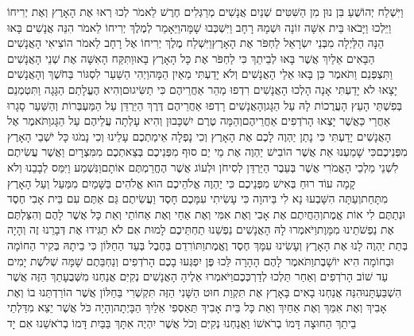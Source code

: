 \documentclass[../main/main.tex]{subfiles}
\begin{document}
\begin{multicols*}{\ncols}
וַיִּשְׁלַח יְהוֹשֻׁעַ בִּן נוּן מִן הַשִּׁטִּים שְׁנַיִם אֲנָשִׁים מְרַגְּלִים חֶרֶשׁ לֵאמֹר לְכוּ רְאוּ אֶת הָאָרֶץ וְאֶת יְרִיחוֹ וַיֵּלְכוּ וַיָּבֹאוּ בֵּית אִשָּׁה זוֹנָה וּשְׁמָהּ רָחָב וַיִּשְׁכְּבוּ שָׁמָּה\PreVerseSpace{}וַיֵּאָמַר לְמֶלֶךְ יְרִיחוֹ לֵאמֹר הִנֵּה אֲנָשִׁים בָּאוּ הֵנָּה הַלַּיְלָה מִבְּנֵי יִשְׂרָאֵל לַחְפֹּר אֶת הָאָרֶץ\PreVerseSpace{}וַיִּשְׁלַח מֶלֶךְ יְרִיחוֹ אֶל רָחָב לֵאמֹר הוֹצִיאִי הָאֲנָשִׁים הַבָּאִים אֵלַיִךְ אֲשֶׁר בָּאוּ לְבֵיתֵךְ כִּי לַחְפֹּר אֶת כָּל הָאָרֶץ בָּאוּ\PreVerseSpace{}וַתִּקַּח הָאִשָּׁה אֶת שְׁנֵי הָאֲנָשִׁים וַתִּצְפְּנֵם\SubEnd{} וַתֹּאמֶר כֵּן בָּאוּ אֵלַי הָאֲנָשִׁים וְלֹא יָדַעְתִּי מֵאַיִן הֵמָּה\PreVerseSpace{}וַיְהִי הַשַּׁעַר לִסְגּוֹר בַּחֹשֶׁךְ וְהָאֲנָשִׁים יָצָאוּ לֹא יָדַעְתִּי אָנָה הָלְכוּ הָאֲנָשִׁים רִדְפוּ מַהֵר אַחֲרֵיהֶם כִּי תַשִּׂיגוּם\PreVerseSpace{}וְהִיא הֶעֱלָתַם הַגָּגָה וַתִּטְמְנֵם בְּפִשְׁתֵּי הָעֵץ הָעֲרֻכוֹת לָהּ עַל הַגָּג\PreVerseSpace{}וְהָאֲנָשִׁים רָדְפוּ אַחֲרֵיהֶם דֶּרֶךְ הַיַּרְדֵּן עַל הַמַּעְבְּרוֹת וְהַשַּׁעַר סָגָרוּ אַחֲרֵי כַּאֲשֶׁר יָצְאוּ הָרֹדְפִים אַחֲרֵיהֶם\PreVerseSpace{}וְהֵמָּה טֶרֶם יִשְׁכָּבוּן וְהִיא עָלְתָה עֲלֵיהֶם עַל הַגָּג\PreVerseSpace{}וַתֹּאמֶר אֶל הָאֲנָשִׁים יָדַעְתִּי כִּי נָתַן יַהְוֶה לָכֶם אֶת הָאָרֶץ וְכִי נָפְלָה אֵימַתְכֶם עָלֵינוּ וְכִי נָמֹגוּ כָּל יֹשְׁבֵי הָאָרֶץ מִפְּנֵיכֶם\PreVerseSpace{}כִּי שָׁמַעְנוּ אֵת אֲשֶׁר הוֹבִישׁ יַהְוֶה אֶת מֵי יַם סוּף מִפְּנֵיכֶם בְּצֵאתְכֶם מִמִּצְרָיִם וַאֲשֶׁר עֲשִׂיתֶם לִשְׁנֵי מַלְכֵי הָאֱמֹרִי אֲשֶׁר בְּעֵבֶר הַיַּרְדֵּן לְסִיחֹן וּלְעוֹג אֲשֶׁר הֶחֱרַמְתֶּם אוֹתָם\PreVerseSpace{}וַנִּשְׁמַע וַיִּמַּס לְבָבֵנוּ וְלֹא קָמָה עוֹד רוּחַ בְּאִישׁ מִפְּנֵיכֶם כִּי יַהְוֶה אֱלֹהֵיכֶם הוּא אֱלֹהִים בַּשָּׁמַיִם מִמַּעַל וְעַל הָאָרֶץ מִתָּחַת\PreVerseSpace{}וְעַתָּה הִשָּׁבְעוּ נָא לִי בַּיהוָה כִּי עָשִׂיתִי עִמָּכֶם חָסֶד וַעֲשִׂיתֶם גַּם אַתֶּם עִם בֵּית אָבִי חֶסֶד וּנְתַתֶּם לִי אוֹת אֱמֶת\PreVerseSpace{}וְהַחֲיִתֶם אֶת אָבִי וְאֶת אִמִּי וְאֶת אַחַי וְאֶת אַחוֹתַי וְאֵת כָּל אֲשֶׁר לָהֶם וְהִצַּלְתֶּם אֶת נַפְשֹׁתֵינוּ מִמָּוֶת\PreVerseSpace{}וַיֹּאמְרוּ לָהּ הָאֲנָשִׁים נַפְשֵׁנוּ תַחְתֵּיכֶם לָמוּת אִם לֹא תַגִּידוּ אֶת דְּבָרֵנוּ זֶה וְהָיָה בְּתֵת יַהְוֶה לָנוּ אֶת הָאָרֶץ וְעָשִׂינוּ עִמָּךְ חֶסֶד וֶאֱמֶת\PreVerseSpace{}וַתּוֹרִדֵם בַּחֶבֶל בְּעַד הַחַלּוֹן כִּי בֵיתָהּ בְּקִיר הַחוֹמָה וּבַחוֹמָה הִיא יוֹשָׁבֶת\PreVerseSpace{}וַתֹּאמֶר לָהֶם הָהָרָה לֵּכוּ פֶּן יִפְגְּעוּ בָכֶם הָרֹדְפִים וְנַחְבֵּתֶם שָׁמָּה שְׁלֹשֶׁת יָמִים עַד שׁוֹב הָרֹדְפִים וְאַחַר תֵּלְכוּ לְדַרְכְּכֶם\PreVerseSpace{}וַיֹּאמְרוּ אֵלֶיהָ הָאֲנָשִׁים נְקִיִּם אֲנַחְנוּ מִשְּׁבֻעָתֵךְ הַזֶּה אֲשֶׁר הִשְׁבַּעְתָּנוּ\PreVerseSpace{}הִנֵּה אֲנַחְנוּ בָאִים בָּאָרֶץ אֶת תִּקְוַת חוּט הַשָּׁנִי הַזֶּה תִּקְשְׁרִי בַּחַלּוֹן אֲשֶׁר הוֹרַדְתֵּנוּ בוֹ וְאֶת אָבִיךְ וְאֶת אִמֵּךְ וְאֶת אַחַיִךְ וְאֵת כָּל בֵּית אָבִיךְ תַּאַסְפִי אֵלַיִךְ הַבָּיְתָה\PreVerseSpace{}וְהָיָה כֹּל אֲשֶׁר יֵצֵא מִדַּלְתֵי בֵיתֵךְ הַחוּצָה דָּמוֹ בְרֹאשׁוֹ וַאֲנַחְנוּ נְקִיִּם וְכֹל אֲשֶׁר יִהְיֶה אִתָּךְ בַּבַּיִת דָּמוֹ בְרֹאשֵׁנוּ אִם יָד 
\end{multicols*}
\end{document}
